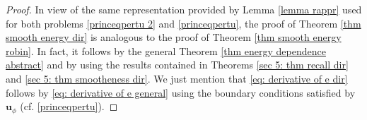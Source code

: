 \documentclass[10pt,a4paper]{amsart}
\begin{document}
\begin{proof}
    In view of the same representation provided by Lemma \ref{lemma rappr} used for both problems \eqref{princeqpertu 2} and \eqref{princeqpertu}, the proof of Theorem \ref{thm smooth energy dir} is analogous to the proof of Theorem \ref{thm smooth energy robin}. In fact, it follows by the general Theorem \ref{thm energy dependence abstract} and by using the results contained in Theorems \ref{sec 5: thm recall dir} and \ref{sec 5: thm smootheness dir}. We just mention that \eqref{eq: derivative of e dir} follows by \eqref{eq: derivative of e general} using the boundary conditions satisfied by $\mathbf{u}_\phi$ (cf. \eqref{princeqpertu}).
\end{proof}
\end{document}
